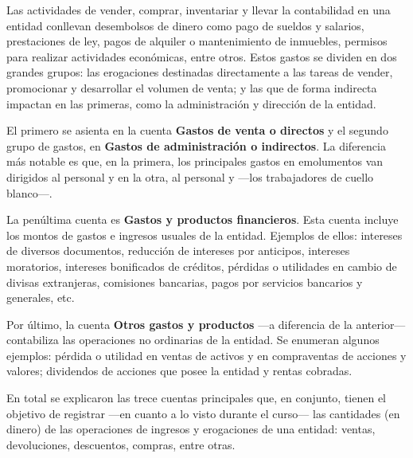 \documentclass[12pt]{article}
\begin{document}
Las actividades de vender, comprar, inventariar y llevar la contabilidad en una entidad conllevan desembolsos de dinero como pago de sueldos y salarios, prestaciones de ley, pagos de alquiler o mantenimiento de inmuebles, permisos para realizar actividades económicas, entre otros. Estos gastos se dividen en dos grandes grupos: las erogaciones destinadas directamente a las tareas de vender, promocionar y desarrollar el volumen de venta; y las que de forma indirecta impactan en las primeras, como la administración y dirección de la entidad. 

El primero se asienta en la cuenta \textbf{Gastos de venta o directos} y el segundo grupo de gastos, en \textbf{Gastos de administración o indirectos}. La diferencia más notable es que, en la primera, los principales gastos en emolumentos van dirigidos al personal  y en la otra, al personal  y  ---los trabajadores de cuello blanco---.

La penúltima cuenta es \textbf{Gastos y productos financieros}. Esta cuenta incluye los montos de gastos e ingresos usuales de la entidad. Ejemplos de ellos: intereses de diversos documentos, reducción de intereses por anticipos, intereses moratorios, intereses bonificados de créditos, pérdidas o utilidades en cambio de divisas extranjeras, comisiones bancarias, pagos por servicios bancarios y generales, etc.

Por último, la cuenta \textbf{Otros gastos y productos} ---a diferencia de la anterior--- contabiliza las operaciones no ordinarias de la entidad. Se enumeran algunos ejemplos: pérdida o utilidad en ventas de activos y en compraventas de acciones y valores; dividendos de acciones que posee la entidad y rentas cobradas.

En total se explicaron las trece cuentas principales que, en conjunto, tienen el objetivo de registrar ---en cuanto a lo visto durante el curso--- las cantidades (en dinero) de las operaciones de ingresos y erogaciones de una entidad: ventas, devoluciones, descuentos, compras, entre otras.
\end{document}
